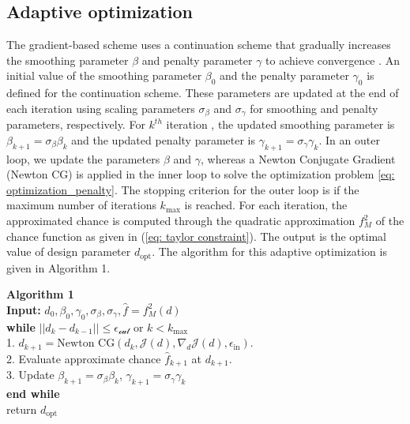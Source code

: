 \documentclass[pdf-a,balance,colorlinks,upint,subscriptcorrection,varvw,mathalfa=cal=boondoxo, spanish,french,vietnamese,russian,greek]{asmeconf}
\begin{document}
\subsection{Adaptive optimization}
\noindent
The gradient-based scheme uses a continuation scheme that gradually increases the smoothing parameter $\beta$ and penalty parameter $\gamma$ to achieve convergence \cite{chen2021taylor}. An initial value of the smoothing parameter $\beta_{0}$ and the penalty parameter $\gamma_{0}$ is defined for the continuation scheme. These parameters are updated at the end of each iteration using scaling parameters $\sigma_{\beta}$ and $\sigma_{\gamma}$ for smoothing and penalty parameters, respectively. For $k^{th}$ iteration , the updated smoothing parameter is $\beta_{k+1} = \sigma_{\beta} \beta_{k}$ and the updated penalty parameter is $\gamma_{k+1} = \sigma_{\gamma} \gamma_{k}$. In an outer loop, we update the parameters $\beta$ and $\gamma$, whereas a Newton Conjugate Gradient (Newton CG) is applied in the inner loop to solve the optimization problem \eqref{eq: optimization_penalty}. The stopping criterion for the outer loop is if the maximum number of iterations $k_{\text{max}}$ is reached. For each iteration, the approximated chance is computed through the quadratic approximation $f_{M}^{2}$ of the chance function as given in (\ref{eq: taylor constraint}). The output is the optimal value of design parameter $d_{\text{opt}}$. The algorithm for this adaptive optimization is given in Algorithm 1.
\begin{algorithm}[H]
    \textbf{Algorithm 1}\\
    \textbf{Input:} $d_{0}, \beta_{0}, \gamma_{0}, \sigma_{\beta}, \sigma_{\gamma}, \hat{f}= f_{M}^{2}(d)$\\
    \textbf{while} $||d_{k} - d_{k-1}|| \leq \mathcal{\epsilon_{\text{out}}}$ or $k<k_{\text{max}}$\\
    1. $d_{k+1} = \text{Newton CG}(d_{k},\mathcal{J}(d), \nabla_{d} \mathcal{J} (d), \epsilon_{\text{in}})$.\\
    2. Evaluate approximate chance $\hat{f}_{k+1}$ at $d_{k+1}$.\\
    3. Update $\beta_{k+1} = \sigma_{\beta} \beta_{k}$, $\gamma_{k+1} = \sigma_{\gamma} \gamma_{k}$\\
    \textbf{end while}\\
    return $d_{\text{opt}}$
\end{algorithm}
\end{document}
